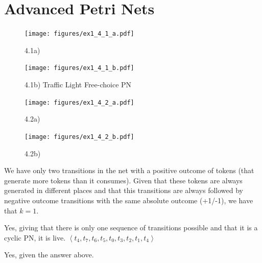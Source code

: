 \documentclass[a4paper]{report}
\begin{document}
\section*{Advanced Petri Nets}



\begin{figure}[H]
    \centering
    \texttt{[image: figures/ex1\_4\_1\_a.pdf]}
    \caption{4.1a)}
    \label{fig:figures-ex1_4_a-pdf}
\end{figure}

\begin{figure}[H]
    \centering
    \texttt{[image: figures/ex1\_4\_1\_b.pdf]}
    \caption{4.1b) Traffic Light Free-choice PN}
    \label{fig:ex1_4_1_b}
\end{figure}


\begin{figure}[H]
    \centering
    \texttt{[image: figures/ex1\_4\_2\_a.pdf]}
    \caption{4.2a)}
    \label{fig:figures-ex1_4_2_a-pdf}
\end{figure}

\begin{figure}[H]
    \centering
    \texttt{[image: figures/ex1\_4\_2\_b.pdf]}
    \caption{4.2b)}
    \label{fig:ex1_4_2_b-pdf}
\end{figure}



We have only two transitions in the net with a positive outcome of tokens (that
generate more tokens than it consumes). Given that these tokens are always generated in different
places and that this transitions are always followed by negative outcome transitions with the same
absolute outcome (+1/-1), we have that $k=1$.


Yes, giving that there is only one sequence of transitions possible and that it is a cyclic PN, it
is live.  $\left< t_4,t_7, t_6, t_5, t_0, t_3, t_2, t_1, t_4 \right>$


Yes, given the answer above.
\end{document}
